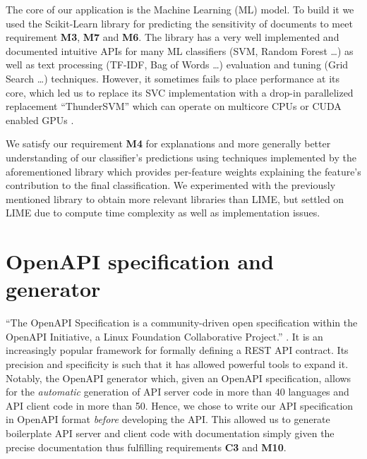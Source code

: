 \documentclass[\version]{l4proj}
\begin{document}
The core of our application is the Machine Learning (ML) model.
To build it we used the Scikit-Learn library \autocite{pedregosaScikitlearnMachineLearning2011} for predicting the sensitivity of documents to meet requirement \textbf{M3}, \textbf{M7} and \textbf{M6}.
The library has a very well implemented and documented intuitive APIs for many ML classifiers (SVM, Random Forest \ldots) as well as text processing (TF-IDF, Bag of Words \ldots) evaluation and tuning (Grid Search \ldots) techniques.
However, it sometimes fails to place performance at its core, which led us to replace its SVC implementation with a drop-in parallelized replacement ``ThunderSVM'' which can operate on multicore CPUs or CUDA enabled GPUs \autocite{wenThunderSVMFastSVM2018}.

We satisfy our requirement \textbf{M4} for explanations and more generally better understanding of our classifier's predictions using techniques implemented by the aforementioned \textcite{ribeiroMarcotcrLime2020} library \autocite{ribeiroWhyShouldTrust2016} which provides per-feature weights explaining the feature's contribution to the final classification.
We experimented with the previously mentioned \textcite{lundbergSlundbergShap2020} library to obtain more relevant libraries than LIME, but settled on LIME due to compute time complexity as well as implementation issues.

\section{OpenAPI specification and generator}

``The OpenAPI Specification is a community-driven open specification within the OpenAPI Initiative, a Linux Foundation Collaborative Project.'' \autocite{OAIOpenAPISpecification2020}.
It is an increasingly popular framework for formally defining a REST API contract.
Its precision and specificity is such that it has allowed powerful tools to expand it.
Notably, the OpenAPI generator \autocite{OpenAPIToolsOpenapigenerator2020} which, given an OpenAPI specification, allows for the \textit{automatic} generation of API server code in more than 40 languages and API client code in more than 50.
Hence, we chose to write our API specification in OpenAPI format \textit{before} developing the API.
This allowed us to generate boilerplate API server and client code with documentation simply given the precise documentation thus fulfilling requirements \textbf{C3} and \textbf{M10}.
\end{document}
